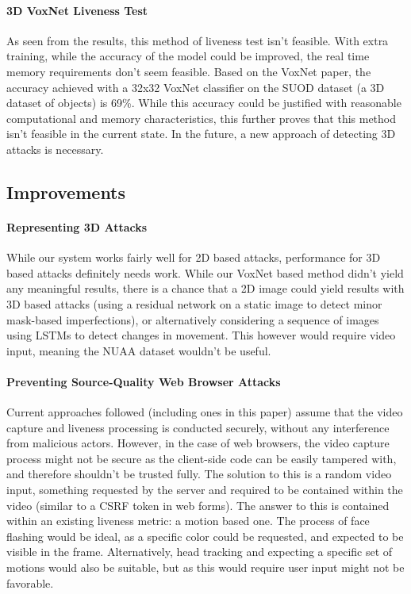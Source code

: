 \documentclass[10pt,a4paper]{article}
\begin{document}
        \paragraph{3D VoxNet Liveness Test}
            As seen from the results, this method of liveness test isn't feasible. With extra training, while the accuracy of the model could be improved, the
            real time memory requirements don't seem feasible. Based on the VoxNet paper, the accuracy achieved with a 32x32 VoxNet classifier on the SUOD dataset (a 3D dataset of objects)
            is 69\%. While this accuracy could be justified with reasonable computational and memory characteristics, this further proves that this method isn't feasible in the current state. In the future, a new approach of detecting 3D attacks is necessary.
    
    \subsection{Improvements}
        \paragraph{Representing 3D Attacks}
        While our system works fairly well for 2D based attacks, performance for 3D based attacks definitely needs work.
        While our VoxNet based method didn't yield any meaningful results, there is a chance that a 2D image could yield results
        with 3D based attacks (using a residual network on a static image to detect minor mask-based imperfections), or alternatively
        considering a sequence of images using LSTMs to detect changes in movement. This however would require video input, meaning the
        NUAA dataset wouldn't be useful.

        \paragraph{Preventing Source-Quality Web Browser Attacks}
        Current approaches followed (including ones in this paper) assume that the video capture and liveness processing is conducted securely, 
        without any interference from malicious actors. However, in the case of web browsers, the video capture process might not be secure as
        the client-side code can be easily tampered with, and therefore shouldn't be trusted fully. The solution to this is a random video input,
        something requested by the server and required to be contained within the video (similar to a CSRF token in web forms). The answer to this
        is contained within an existing liveness metric: a motion based one. The process of face flashing would be ideal, as a specific color could
        be requested, and expected to be visible in the frame. Alternatively, head tracking and expecting a specific set of motions would also be suitable,
        but as this would require user input might not be favorable.
\end{document}
